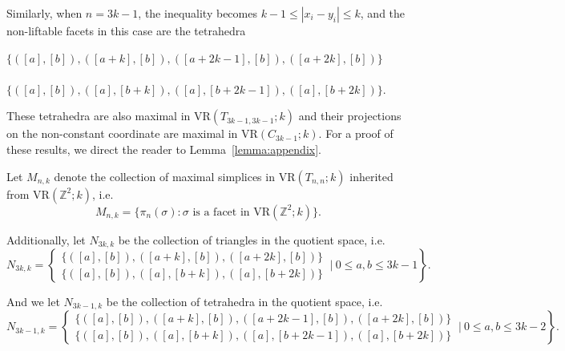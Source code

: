\documentclass[12pt,a4paper]{amsart}
\theoremstyle{definition}
\newcommand{\Z}{\ensuremath{\mathbb{Z}}}
\newcommand{\vr}[2]{\mathrm{VR}(#1;#2)}
\newcommand{\cl}{\ensuremath{\mathrm{Cl}}}
\newcommand{\note}[1]{\textcolor{blue}{({#1})}}
\numberwithin{equation}{section}
\begin{document}
Similarly, when $n=3k-1$, the inequality becomes $k-1\leq |x_i-y_i|\leq k$, and the non-liftable facets in this case are the tetrahedra
\begin{center}
$\{([a], [b]), ([a+k], [b]), ([a+2k-1], [b]), ([a+2k], [b])\}$\\\\$\{([a], [b]), ([a], [b+k]), ([a], [b+2k-1]), ([a], [b+2k])\}$.
\end{center}
These tetrahedra are also maximal in $\vr{T_{3k-1,3k-1}}{k}$ and their projections on the non-constant coordinate are maximal in $\vr{C_{3k-1}}{k}$.
For a proof of these results, we direct the reader to Lemma~\ref{lemma:appendix}.

Let $M_{n, k}$ denote the collection of maximal simplices in $\vr{T_{n, n}}{k}$ inherited from $\vr{\Z^2}{k}$, i.e.\ 
\[M_{n, k} = \{\pi_n (\sigma): \sigma \text{ is a facet in }\vr{\Z^2}{k}\}.\] 

Additionally, let $N_{3k,k}$ be the collection of triangles in the quotient space, i.e.\ 
\[N_{3k,k}=\left\{\substack{\{([a], [b]), ([a+k], [b]), ([a+2k], [b])\} \\ \{([a], [b]), ([a], [b+k]), ([a], [b+2k])\}}~|~0\leq a, b \le 3k-1\right\}.\]

And we let $N_{3k-1,k}$ be the collection of tetrahedra in the quotient space, i.e.\ 
\[N_{3k-1,k}=\left\{\substack{\{([a], [b]), ([a+k], [b]), ([a+2k-1], [b]), ([a+2k], [b])\} \\ \{([a], [b]), ([a], [b+k]), ([a], [b+2k-1]), ([a], [b+2k])\}}~|~0\leq a, b \leq 3k-2\right\}.\]
\end{document}
